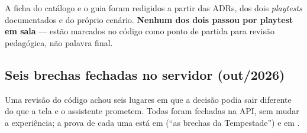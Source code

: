 \begin{limitacao}
A ficha do catálogo e o guia foram redigidos a partir das ADRs, dos dois
\emph{playtests} documentados e do próprio cenário. \textbf{Nenhum dos dois
passou por playtest em sala} --- estão marcados no código como ponto de partida
para revisão pedagógica, não palavra final.
\end{limitacao}

\subsection{Seis brechas fechadas no servidor (out/2026)}

Uma revisão do código achou seis lugares em que a decisão podia sair diferente
do que a tela e o assistente prometem. Todas foram fechadas na API, sem mudar a
experiência; a prova de cada uma está em 
(\enquote{as brechas da Tempestade}) e em .

